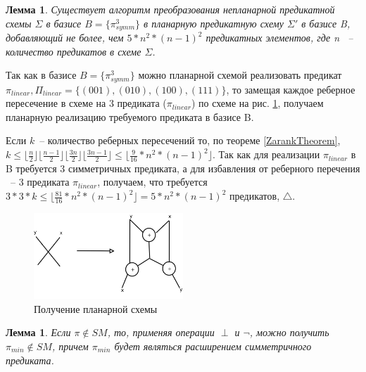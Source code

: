 \documentclass[12pt]{article}
\newtheorem{lemma}[theorem]{Лемма}
\newenvironment{proof}[1][Доказательство]{\begin{trivlist}
\item[\hskip \labelsep {\bfseries #1}]}{\end{trivlist}}
\begin{document}
\label{planar_basis}
\begin{lemma}
\label{eq:planar_algo}
Существует алгоритм преобразования непланарной предикатной схемы $\Sigma$ в базисе $B=\{\pi_{symm}^3\}$
в планарную предикатную схему $\Sigma'$ в базисе B, добавляющий не более, чем 
$5 * n^2*(n-1)^2 $ предикатных элементов, где n ~-- количество предикатов в схеме $\Sigma$.
\end{lemma}
\begin{proof}
Так как в базисе $B=\{\pi_{symm}^3\}$ можно планарной схемой реализовать предикат 
$\pi_{linear}, \Pi_{linear} = \{ (001), (010), (100), (111) \}$, то замещая каждое реберное пересечение в схеме на 
3 предиката ($\pi_{linear}$) по схеме на рис. \ref{fig:xor}, получаем планарную реализацию требуемого предиката
в базисе B.

Если $k$~-- количество реберных пересечений то, по теореме \ref{ZarankTheorem}, 
$k \leq \lfloor \frac{n}{2} \rfloor \lfloor \frac{n-1}{2} \rfloor \lfloor \frac{3n}{2} \rfloor \lfloor \frac{3n-1}{2} \rfloor \le \lfloor \frac{9}{16} * n^2*(n-1)^2 \rfloor$.
Так как для реализации $\pi_{linear}$ в B требуется 3 симметричных предиката, а для избавления
от реберного перечения ~-- 3 предиката $\pi_{linear}$, получаем, что требуется $3*3*k \leq \lfloor \frac{81}{16} * n^2 * (n-1)^2 \rfloor = 5 * n^2 * (n-1)^2$ предикатов, $\bigtriangleup$.

\end{proof}

\begin{figure}[htb]
\centering
\includegraphics[width=0.5\textwidth]{intersection.png}
\caption{Получение планарной схемы}
\label{fig:xor}
\end{figure}


\begin{lemma}
\label{eq:lemma_sm}
Если $\pi \notin SM$, то, применяя операции $\perp$ и $\neg$,
можно получить $\pi_{min} \notin SM$, причем $\pi_{min}$ будет являться расширением симметричного предиката.
\end{lemma}
\end{document}
